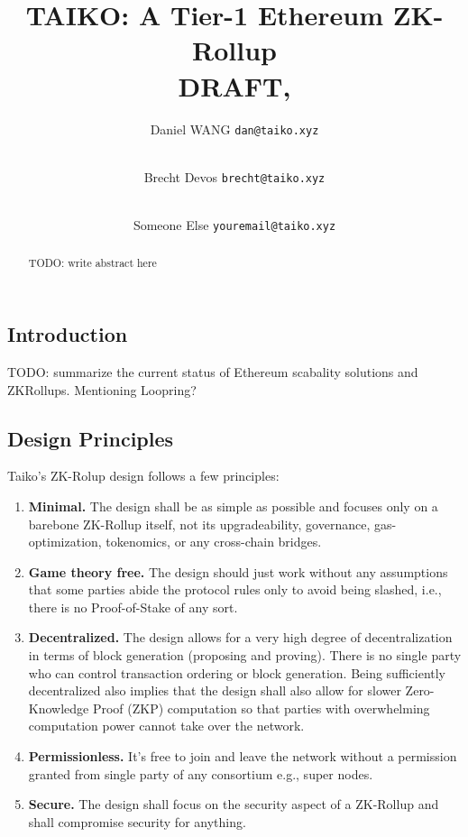 \documentclass[9pt,oneside]{amsart}
\title[TAIKO: A Tier-1 Ethereum ZK-Rollup\\ \smaller
\textbf{{DRAFT}}]{TAIKO: A Tier-1 Ethereum ZK-Rollup \\ \smaller \textbf{{DRAFT, \thedate}}}
\author{
  Daniel WANG \texttt{dan@taiko.xyz}
  \and \\
  Brecht Devos \texttt{brecht@taiko.xyz}
   \and \\
  Someone Else \texttt{youremail@taiko.xyz}
}
\begin{document}
\pagecolor{pagecolor}

\begin{abstract}
\color{brown}
TODO: write abstract here
\color{black}

\end{abstract}

\maketitle

\setlength{\columnsep}{20pt}
\begin{multicols}{2}


\section{Introduction}

\color{brown}
TODO: summarize the current status of Ethereum scabality solutions and ZKRollups. Mentioning Loopring?

\color{black}

\subsection{Design Principles}

Taiko's ZK-Rolup design follows a few principles:

\begin{enumerate}
\item \textbf{Minimal.} The design shall be as simple as possible and focuses only on a barebone ZK-Rollup itself, not its upgradeability, governance, gas-optimization, tokenomics, or any cross-chain bridges.
\item  \textbf{Game theory free.} The design should just work without any assumptions that some parties abide the protocol rules only to avoid being slashed, i.e., there is no Proof-of-Stake of any sort.
\item \textbf{Decentralized.} The design allows for a very high degree of decentralization in terms of block generation (proposing and proving).  There is no single party who can control transaction ordering or block generation. Being sufficiently decentralized also implies that the design shall also allow for slower Zero-Knowledge Proof (ZKP) computation so that parties with overwhelming computation power cannot take over the network. 
\item \textbf{Permissionless.} It's free to join and leave the network without a permission granted from single party of any consortium e.g., super nodes.
\item \textbf{Secure.} The design shall focus on the security aspect of a ZK-Rollup and shall compromise security for anything.
\end{enumerate}


\end{multicols}
\end{document}
